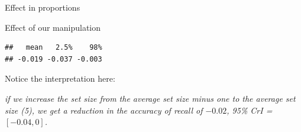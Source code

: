 \documentclass[12pt,ignorenonframetext,aspectratio=169]{beamer}
\newenvironment{Shaded}{\begin{snugshade}}{\end{snugshade}}
\newcommand{\DataTypeTok}[1]{\textcolor[rgb]{0.13,0.29,0.53}{#1}}
\newcommand{\DecValTok}[1]{\textcolor[rgb]{0.00,0.00,0.81}{#1}}
\newcommand{\FloatTok}[1]{\textcolor[rgb]{0.00,0.00,0.81}{#1}}
\newcommand{\KeywordTok}[1]{\textcolor[rgb]{0.13,0.29,0.53}{\textbf{#1}}}
\newcommand{\NormalTok}[1]{#1}
\newcommand{\OperatorTok}[1]{\textcolor[rgb]{0.81,0.36,0.00}{\textbf{#1}}}
\newcommand{\StringTok}[1]{\textcolor[rgb]{0.31,0.60,0.02}{#1}}
\begin{document}
\begin{frame}[fragile]{Effect in proportions}
\protect\hypertarget{effect-in-proportions-1}{}

Effect of our manipulation

\small

\begin{Shaded}
\end{Shaded}

\begin{verbatim}
##   mean   2.5%    98% 
## -0.019 -0.037 -0.003
\end{verbatim}

\normalsize

Notice the interpretation here:

\emph{if we increase the set size from the average set size minus one to the average set size (5), we get a reduction in the accuracy of recall of \(-0.02\), 95\% CrI = \([ -0.04 , 0 ]\).}

\end{frame}
\end{document}
